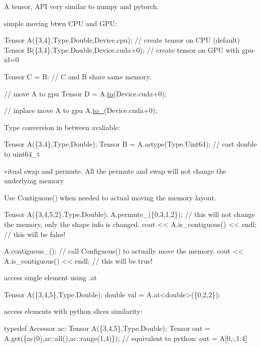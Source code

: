 \begin{DoxyItemize}
\item A tensor, A\+PI very similar to numpy and pytorch.
\item simple moving btwn C\+PU and G\+PU\+: 
\begin{DoxyCode}
Tensor A(\{3,4\},Type.Double,Device.cpu); \textcolor{comment}{// create tensor on CPU (default)}
Tensor B(\{3,4\},Type.Double,Device.cuda+0); \textcolor{comment}{// create tensor on GPU with gpu-id=0}


Tensor C = B; \textcolor{comment}{// C and B share same memory.}

\textcolor{comment}{// move A to gpu}
Tensor D = A.\hyperlink{classcytnx_1_1Tensor_acf7f697a9434f9bc98a7d00a555ee982}{to}(Device.cuda+0);

\textcolor{comment}{// inplace move A to gpu}
A.\hyperlink{classcytnx_1_1Tensor_a114a31fbb8bf4a90f150b6a67e42183a}{to\_}(Device.cuda+0);
\end{DoxyCode}

\item Type conversion in between avaliable\+: 
\begin{DoxyCode}
Tensor A(\{3,4\},Type.Double);
Tensor B = A.astype(Type.Uint64); \textcolor{comment}{// cast double to uint64\_t}
\end{DoxyCode}

\item vitual swap and permute. All the permute and swap will not change the underlying memory
\item Use Contiguous() when needed to actual moving the memory layout. 
\begin{DoxyCode}
Tensor A(\{3,4,5,2\},Type.Double);
A.permute\_(\{0,3,1,2\}); \textcolor{comment}{// this will not change the memory, only the shape info is changed.}
cout << A.is\_contiguous() << endl; \textcolor{comment}{// this will be false!}

A.contiguous\_(); \textcolor{comment}{// call Configuous() to actually move the memory.}
cout << A.is\_contiguous() << endl; \textcolor{comment}{// this will be true!}
\end{DoxyCode}

\item access single element using .at 
\begin{DoxyCode}
Tensor A(\{3,4,5\},Type.Double);
\textcolor{keywordtype}{double} val = A.at<\textcolor{keywordtype}{double}>(\{0,2,2\});
\end{DoxyCode}

\item access elements with python slices similarity\+: 
\begin{DoxyCode}
\textcolor{keyword}{typedef} Accessor ac;
Tensor A(\{3,4,5\},Type.Double);
Tensor out = A.get(\{ac(0),ac::all(),ac::range(1,4)\}); 
\textcolor{comment}{// equivalent to python: out = A[0,:,1:4]    }
\end{DoxyCode}

\end{DoxyItemize}

